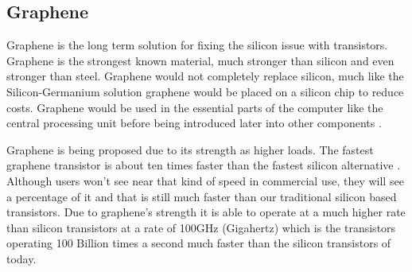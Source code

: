 \documentclass[journal]{IEEEtran}
\begin{document}
\subsection{Graphene}
Graphene is the long term solution for fixing the silicon issue with transistors. Graphene is the strongest known material, much stronger than silicon and even stronger than steel. Graphene would not completely replace silicon, much like the Silicon-Germanium solution graphene would be placed on a silicon chip to reduce costs. Graphene would be used in the essential parts of the computer like the central processing unit before being introduced later into other components \cite{48600520130101}.

Graphene is being proposed due to its strength as higher loads. The fastest graphene transistor is about ten times faster than the fastest silicon alternative \cite{bourzac_2010}. Although users won't see near that kind of speed in commercial use, they will see a percentage of it and that is still much faster than our traditional silicon based transistors. Due to graphene's strength it is able to operate at a much higher rate than silicon transistors at a rate of 100GHz (Gigahertz) which is the transistors operating 100 Billion times a second much faster than the silicon transistors of today. 



\printbibliography
\end{document}
